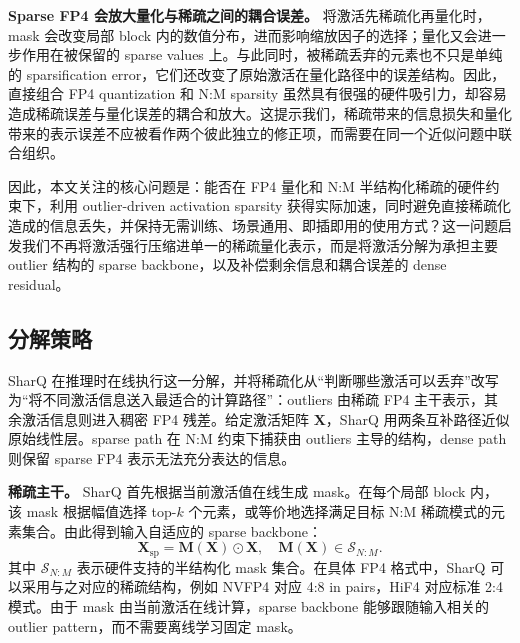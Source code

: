 \documentclass{article}
\begin{document}
\textbf{Sparse FP4 会放大量化与稀疏之间的耦合误差。}
将激活先稀疏化再量化时，mask 会改变局部 block 内的数值分布，进而影响缩放因子的选择；量化又会进一步作用在被保留的
sparse values 上。与此同时，被稀疏丢弃的元素也不只是单纯的
sparsification error，它们还改变了原始激活在量化路径中的误差结构。因此，直接组合
FP4 quantization 和 N:M sparsity 虽然具有很强的硬件吸引力，却容易造成稀疏误差与量化误差的耦合和放大。这提示我们，稀疏带来的信息损失和量化带来的表示误差不应被看作两个彼此独立的修正项，而需要在同一个近似问题中联合组织。

因此，本文关注的核心问题是：能否在 FP4 量化和 N:M 半结构化稀疏的硬件约束下，利用
outlier-driven activation sparsity 获得实际加速，同时避免直接稀疏化造成的信息丢失，并保持无需训练、场景通用、即插即用的使用方式？这一问题启发我们不再将激活强行压缩进单一的稀疏量化表示，而是将激活分解为承担主要
outlier 结构的 sparse backbone，以及补偿剩余信息和耦合误差的 dense residual。

\subsection{分解策略}

SharQ 在推理时在线执行这一分解，并将稀疏化从“判断哪些激活可以丢弃”改写为“将不同激活信息送入最适合的计算路径”：outliers
由稀疏 FP4 主干表示，其余激活信息则进入稠密 FP4 残差。给定激活矩阵
$\mathbf{X}$，SharQ 用两条互补路径近似原始线性层。sparse path 在
N:M 约束下捕获由 outliers 主导的结构，dense path 则保留 sparse FP4 表示无法充分表达的信息。

\textbf{稀疏主干。}
SharQ 首先根据当前激活值在线生成 mask。在每个局部 block 内，该 mask 根据幅值选择
top-$k$ 个元素，或等价地选择满足目标 N:M 稀疏模式的元素集合。由此得到输入自适应的 sparse backbone：
\begin{equation}
  \mathbf{X}_{\mathrm{sp}}
  =
  \mathbf{M}(\mathbf{X}) \odot \mathbf{X},
  \quad
  \mathbf{M}(\mathbf{X}) \in \mathcal{S}_{N:M}.
  \label{eq:sharq-sparse-backbone}
\end{equation}
其中 $\mathcal{S}_{N:M}$ 表示硬件支持的半结构化 mask 集合。在具体 FP4
格式中，SharQ 可以采用与之对应的稀疏结构，例如 NVFP4 对应 4:8 in pairs，HiF4 对应标准
2:4 模式。由于 mask 由当前激活在线计算，sparse backbone 能够跟随输入相关的
outlier pattern，而不需要离线学习固定 mask。
\end{document}
